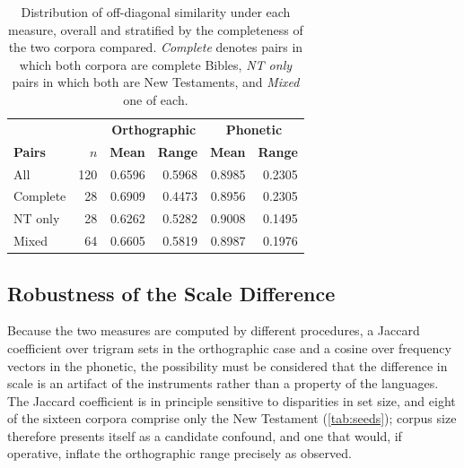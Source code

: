 \begin{table}[h!]
    \centering
    \scriptsize
    \setlength{\tabcolsep}{3.5pt}
    \begin{tabular}{lrrrrr}
        \hline
                       &                & \multicolumn{2}{c}{\textbf{Orthographic}} & \multicolumn{2}{c}{\textbf{Phonetic}}                                  \\
        \textbf{Pairs} & \textbf{\(n\)} & \textbf{Mean}                             & \textbf{Range}                        & \textbf{Mean} & \textbf{Range} \\
        \hline
        All            & 120            & 0.6596                                    & 0.5968                                & 0.8985        & 0.2305         \\
        Complete       & 28             & 0.6909                                    & 0.4473                                & 0.8956        & 0.2305         \\
        NT only        & 28             & 0.6262                                    & 0.5282                                & 0.9008        & 0.1495         \\
        Mixed          & 64             & 0.6605                                    & 0.5819                                & 0.8987        & 0.1976         \\
        \hline
    \end{tabular}
    \caption{Distribution of off-diagonal similarity under each measure, overall
        and stratified by the completeness of the two corpora compared.
        \emph{Complete} denotes pairs in which both corpora are complete Bibles,
        \emph{NT only} pairs in which both are New Testaments, and \emph{Mixed}
        one of each.}\label{tab:metric_comparison}
\end{table}

\subsection{Robustness of the Scale Difference}

Because the two measures are computed by different procedures, a Jaccard
coefficient over trigram sets in the orthographic case and a cosine over
frequency vectors in the phonetic, the possibility must be considered that the
difference in scale is an artifact of the instruments rather than a property of
the languages. The Jaccard coefficient is in principle sensitive to disparities
in set size, and eight of the sixteen corpora comprise only the New Testament
(\cref{tab:seeds}); corpus size therefore presents itself as a candidate
confound, and one that would, if operative, inflate the orthographic range
precisely as observed.

